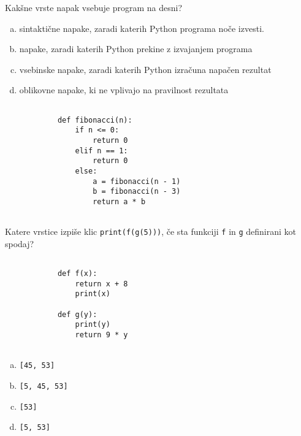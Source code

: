 \documentclass[arhiv, 10pt]{../izpit}
\newcommand{\inlinepy}[1]{\texttt{#1}}
\begin{document}
        \naloga*
        \begin{multicols}{2}
        \noindent
        Kakšne vrste napak vsebuje program na desni?

        \begin{enumerate}[(a)]
\item sintaktične napake, zaradi katerih Python programa noče izvesti.
\item napake, zaradi katerih Python prekine z izvajanjem programa
\item vsebinske napake, zaradi katerih Python izračuna napačen rezultat
\item oblikovne napake, ki ne vplivajo na pravilnost rezultata
\end{enumerate}

        \columnbreak

        \begin{verbatim}
        
            def fibonacci(n):
                if n <= 0:
                    return 0
                elif n == 1:
                    return 0
                else:
                    a = fibonacci(n - 1)
                    b = fibonacci(n - 3)
                    return a * b
            
        \end{verbatim}

        \end{multicols}

    
        \naloga*
        Katere vrstice izpiše klic \inlinepy{print(f(g(5)))}, če sta funkciji \inlinepy{f} in \inlinepy{g} definirani kot spodaj?

        \begin{multicols}{2}
        \begin{verbatim}
        
            def f(x):
                return x + 8
                print(x)

            def g(y):
                print(y)
                return 9 * y
        
        \end{verbatim}

        \begin{enumerate}[(a)]
\item \inlinepy{[45, 53]}
\item \inlinepy{[5, 45, 53]}
\item \inlinepy{[53]}
\item \inlinepy{[5, 53]}
\end{enumerate}

        \end{multicols}
    
\end{document}
